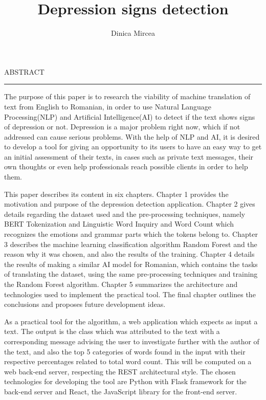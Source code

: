 \documentclass[12pt]{report}
\begin{document}
\title{Depression signs detection}					   
\author{Dinica Mircea}											
				
\maketitle


\newpage
\thispagestyle{empty}
\mbox{}
\newpage
{} 

\cleardoublepage
ABSTRACT
\vspace{0.5cm}	
\hrule
\vspace{0.5cm}	

The purpose of this paper is to research the viability of machine translation of text from English to Romanian, in order to use Natural Language Processing(NLP) and Artificial Intelligence(AI) to detect if the text shows signs of depression or not. Depression is a major problem right now, which if not addressed can cause serious problems. With the help of NLP and AI, it is desired to develop a tool for giving an opportunity to its users to have an easy way to get an initial assessment of their texts, in cases such as private text messages, their own thoughts or even help professionals reach possible clients in order to help them.

This paper describes its content in six chapters. Chapter 1 provides the motivation and purpose of the depression detection application. Chapter 2 gives details regarding the dataset used and the pre-processing techniques, namely BERT Tokenization and Linguistic Word Inquiry and Word Count which recognizes the emotions and grammar parts which the tokens belong to. Chapter 3 describes the machine learning classification algorithm Random Forest and the reason why it was chosen, and also the results of the training. Chapter 4 details the results of making a similar AI model for Romanian, which contains the tasks of translating the dataset, using the same pre-processing techniques and training the Random Forest algorithm.
Chapter 5 summarizes the architecture and technologies used to implement the practical tool. The final chapter outlines the conclusions and proposes future development ideas. 

As a practical tool for the algorithm, a web application which expects as input a text. The output is the class which was attributed to the text with a corresponding message advising the user to investigate further with the author of the text, and also the top 5 categories of words found in the input with their respective percentages related to total word count. This will be computed on a web back-end server, respecting the REST architectural style. The chosen technologies for developing the tool are Python with Flask framework for the back-end server and React, the JavaScript library for the front-end server.
\end{document}
